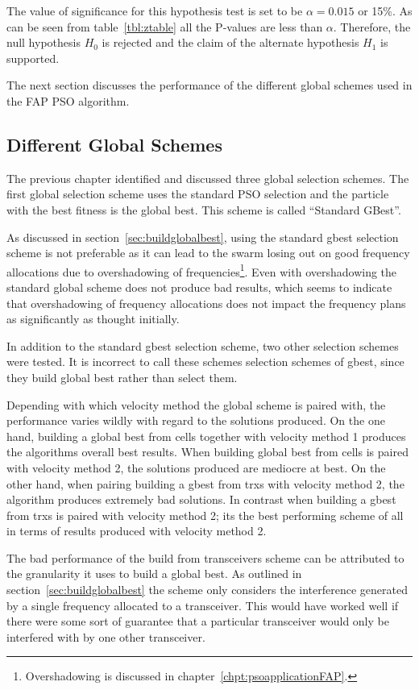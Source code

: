 The value of significance for this hypothesis test is set to be $\alpha=0.015$ or 15\%. As can be seen from table~\ref{tbl:ztable} all the P-values are less than $\alpha$. Therefore, the null hypothesis $H_0$ is rejected and the claim of the alternate hypothesis $H_1$ is supported.

The next section discusses the performance of the different global schemes used in the FAP PSO algorithm.
\subsection{Different Global Schemes}
\label{sec:diffglobalschemes}
The previous chapter identified and discussed three global selection schemes. The first global selection scheme uses the standard PSO selection and the particle with the best fitness is the global best. This scheme is called ``Standard GBest''.

As discussed in section~\ref{sec:buildglobalbest}, using the standard gbest selection scheme is not preferable as it can lead to the swarm losing out on good frequency allocations due to overshadowing of frequencies\footnote{Overshadowing is discussed in chapter~\ref{chpt:psoapplicationFAP}.}.
Even with overshadowing the standard global scheme does not produce bad results, which seems to indicate that overshadowing of frequency allocations does not impact the frequency plans as significantly as thought initially.

In addition to the standard gbest selection scheme, two other selection schemes were tested. It is incorrect to call these schemes selection schemes of gbest, since they build global best rather than select them.

Depending with which velocity method the global scheme is paired with, the performance varies wildly with regard to the solutions produced. On the one hand, building a global best from cells together with velocity method 1 produces the algorithms overall best results. When building global best from cells is paired with velocity method 2, the solutions produced are mediocre at best. On the other hand, when pairing building a gbest from trxs with velocity method 2, the algorithm produces extremely bad solutions. In contrast when building a gbest from trxs is paired with velocity method 2; its the best performing scheme of all in terms of results produced with velocity method 2.

The bad performance of the build from transceivers scheme can be attributed to the granularity it uses to build a global best. As outlined in section~\ref{sec:buildglobalbest} the scheme only considers the interference generated by a single frequency allocated to a transceiver. This would have worked well if there were some sort of guarantee that a particular transceiver would only be interfered with by one other transceiver.

